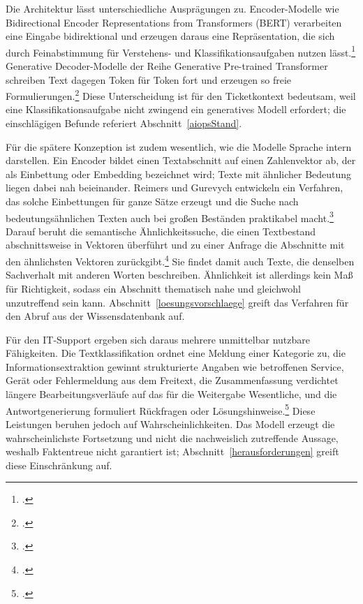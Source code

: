 Die Architektur l\"asst unterschiedliche Auspr\"agungen zu. Encoder-Modelle wie Bidirectional Encoder Representations from Transformers (BERT) verarbeiten eine Eingabe bidirektional und erzeugen daraus eine Repr\"asentation, die sich durch Feinabstimmung f\"ur Verstehens- und Klassifikationsaufgaben nutzen l\"asst.\footcite[Vgl.][hier S.~4171 und 4173]{Devlin2019} Generative Decoder-Modelle der Reihe Generative Pre-trained Transformer schreiben Text dagegen Token f\"ur Token fort und erzeugen so freie Formulierungen.\footcite[Vgl.][S.~1877\,f.]{Brown2020} Diese Unterscheidung ist f\"ur den Ticketkontext bedeutsam, weil eine Klassifikationsaufgabe nicht zwingend ein generatives Modell erfordert; die einschl\"agigen Befunde referiert Abschnitt~\ref{aiopsStand}.

F\"ur die sp\"atere Konzeption ist zudem wesentlich, wie die Modelle Sprache intern darstellen. Ein Encoder bildet einen Textabschnitt auf einen Zahlenvektor ab, der als Einbettung oder Embedding bezeichnet wird; Texte mit \"ahnlicher Bedeutung liegen dabei nah beieinander. Reimers und Gurevych entwickeln ein Verfahren, das solche Einbettungen f\"ur ganze S\"atze erzeugt und die Suche nach bedeutungs\"ahnlichen Texten auch bei gro{\ss}en Best\"anden praktikabel macht.\footcite[Vgl.][hier S.~3982\,f.]{ReimersGurevych2019} Darauf beruht die semantische \"Ahnlichkeitssuche, die einen Textbestand abschnittsweise in Vektoren \"uberf\"uhrt und zu einer Anfrage die Abschnitte mit den \"ahnlichsten Vektoren zur\"uckgibt.\footcite[Vgl.][S.~3]{Gao2023} Sie findet damit auch Texte, die denselben Sachverhalt mit anderen Worten beschreiben. \"Ahnlichkeit ist allerdings kein Ma{\ss} f\"ur Richtigkeit, sodass ein Abschnitt thematisch nahe und gleichwohl unzutreffend sein kann. Abschnitt~\ref{loesungsvorschlaege} greift das Verfahren f\"ur den Abruf aus der Wissensdatenbank auf.

F\"ur den IT-Support ergeben sich daraus mehrere unmittelbar nutzbare F\"ahigkeiten. Die Textklassifikation ordnet eine Meldung einer Kategorie zu, die Informationsextraktion gewinnt strukturierte Angaben wie betroffenen Service, Ger\"at oder Fehlermeldung aus dem Freitext, die Zusammenfassung verdichtet l\"angere Bearbeitungsverl\"aufe auf das f\"ur die Weitergabe Wesentliche, und die Antwortgenerierung formuliert R\"uckfragen oder L\"osungshinweise.\footcite[Vgl.][S.~70\,f.]{Zhao2023} Diese Leistungen beruhen jedoch auf Wahrscheinlichkeiten. Das Modell erzeugt die wahrscheinlichste Fortsetzung und nicht die nachweislich zutreffende Aussage, weshalb Faktentreue nicht garantiert ist; Abschnitt~\ref{herausforderungen} greift diese Einschr\"ankung auf.

